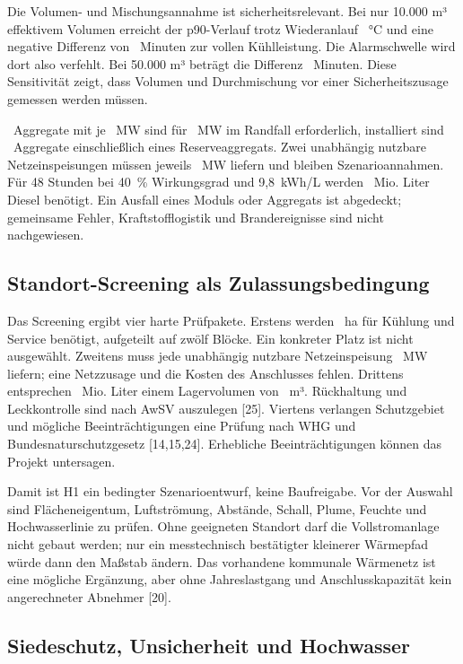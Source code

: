 Die Volumen- und Mischungsannahme ist sicherheitsrelevant. Bei nur 10.000 m³ effektivem Volumen erreicht der p90-Verlauf trotz Wiederanlauf \VolumePeakLow~°C und eine negative Differenz von \VolumeMarginLow~Minuten zur vollen Kühlleistung. Die Alarmschwelle wird dort also verfehlt. Bei 50.000 m³ beträgt die Differenz \VolumeMarginHigh~Minuten. Diese Sensitivität zeigt, dass Volumen und Durchmischung vor einer Sicherheitszusage gemessen werden müssen.

\BackupRequired~Aggregate mit je \BackupAggregateCapacity~MW sind für \DesignElectric~MW im Randfall erforderlich, installiert sind \BackupInstalled~Aggregate einschließlich eines Reserveaggregats. Zwei unabhängig nutzbare Netzeinspeisungen müssen jeweils \DesignElectric~MW liefern und bleiben Szenarioannahmen. Für 48 Stunden bei 40~\% Wirkungsgrad und 9,8~kWh/L werden \FuelReserve~Mio. Liter Diesel benötigt. Ein Ausfall eines Moduls oder Aggregats ist abgedeckt; gemeinsame Fehler, Kraftstofflogistik und Brandereignisse sind nicht nachgewiesen.

\subsection{Standort-Screening als Zulassungsbedingung}

Das Screening ergibt vier harte Prüfpakete. Erstens werden \AirServiceArea~ha für Kühlung und Service benötigt, aufgeteilt auf zwölf Blöcke. Ein konkreter Platz ist nicht ausgewählt. Zweitens muss jede unabhängig nutzbare Netzeinspeisung \DesignElectric~MW liefern; eine Netzzusage und die Kosten des Anschlusses fehlen. Drittens entsprechen \FuelReserve~Mio. Liter einem Lagervolumen von \DieselVolume~m³. Rückhaltung und Leckkontrolle sind nach AwSV auszulegen [25]. Viertens verlangen Schutzgebiet und mögliche Beeinträchtigungen eine Prüfung nach WHG und Bundesnaturschutzgesetz [14,15,24]. Erhebliche Beeinträchtigungen können das Projekt untersagen.

Damit ist H1 ein bedingter Szenarioentwurf, keine Baufreigabe. Vor der Auswahl sind Flächeneigentum, Luftströmung, Abstände, Schall, Plume, Feuchte und Hochwasserlinie zu prüfen. Ohne geeigneten Standort darf die Vollstromanlage nicht gebaut werden; nur ein messtechnisch bestätigter kleinerer Wärmepfad würde dann den Maßstab ändern. Das vorhandene kommunale Wärmenetz ist eine mögliche Ergänzung, aber ohne Jahreslastgang und Anschlusskapazität kein angerechneter Abnehmer [20].

\subsection{Siedeschutz, Unsicherheit und Hochwasser}

